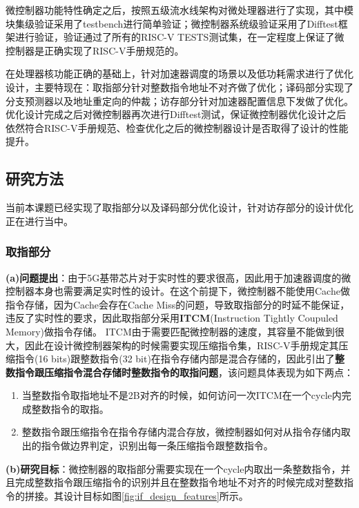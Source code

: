 \documentclass[a4paper, 12pt]{article}
\begin{document}
微控制器功能特性确定之后，按照五级流水线架构对微处理器进行了实现，其中模块集级验证采用了testbench进行简单验证；微控制器系统级验证采用了Difftest框架进行验证，验证通过了所有的RISC-V TESTS测试集，在一定程度上保证了微控制器是正确实现了RISC-V手册规范的。

在处理器核功能正确的基础上，针对加速器调度的场景以及低功耗需求进行了优化设计，主要特现在：取指部分针对整数指令地址不对齐做了优化；译码部分实现了分支预测器以及地址重定向的仲裁；访存部分针对加速器配置信息下发做了优化。优化设计完成之后对微控制器再次进行Difftest测试，保证微控制器优化设计之后依然符合RISC-V手册规范、检查优化之后的微控制器设计是否取得了设计的性能提升。
  
\newpage
\subsection{研究方法}%
当前本课题已经实现了取指部分以及译码部分优化设计，针对访存部分的设计优化正在进行当中。
\subsubsection{取指部分}
\textbf{(a)问题提出}：由于5G基带芯片对于实时性的要求很高，因此用于加速器调度的微控制器本身也需要满足实时性的设计。在这个前提下，微控制器不能使用Cache做指令存储，因为Cache会存在Cache Miss的问题，导致取指部分的时延不能保证，违反了实时性的要求，因此取指部分采用\textbf{ITCM}(Instruction Tightly Coupuled Memory)做指令存储。
ITCM由于需要匹配微控制器的速度，其容量不能做到很大，因此在设计微控制器架构的时候需要实现压缩指令集，RISC-V手册规定其压缩指令(16 bits)跟整数指令(32 bit)在指令存储内部是混合存储的，因此引出了\textbf{整数指令跟压缩指令混合存储时整数指令的取指问题}，该问题具体表现为如下两点：
\begin{enumerate}
  \item 当整数指令取指地址不是2B对齐的时候，如何访问一次ITCM在一个cycle内完成整数指令的取指。
  \item 整数指令跟压缩指令在指令存储内混合存放，微控制器如何对从指令存储内取出的指令做边界判定，识别出每一条压缩指令跟整数指令。
\end{enumerate}

\textbf{(b)研究目标}：微控制器的取指部分需要实现在一个cycle内取出一条整数指令，并且完成整数指令跟压缩指令的识别并且在整数指令地址不对齐的时候完成对整数指令的拼接。其设计目标如图\ref{fig:if_design_features}所示。
\end{document}
